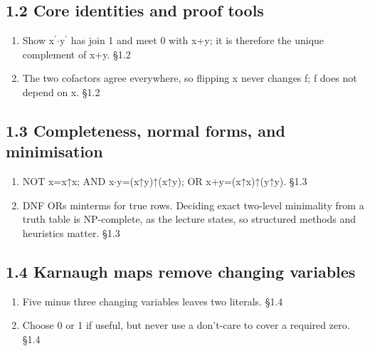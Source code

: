 \documentclass[11pt]{article}
\begin{document}
\begin{keepsection}\subsection{1.2 Core identities and proof tools}

\begin{enumerate}
\item Show x\ensuremath{{}^{\prime}}\ensuremath{\cdot}y\ensuremath{{}^{\prime}} has join 1 and meet 0 with x+y; it is therefore the unique complement of x+y. \hfill{\small\color{FAUblue}§1.2}
\item The two cofactors agree everywhere, so flipping x never changes f; f does not depend on x. \hfill{\small\color{FAUblue}§1.2}
\end{enumerate}

\end{keepsection}
\begin{keepsection}\subsection{1.3 Completeness, normal forms, and minimisation}

\begin{enumerate}
\item NOT x=x↑x; AND x\ensuremath{\cdot}y=(x↑y)↑(x↑y); OR x+y=(x↑x)↑(y↑y). \hfill{\small\color{FAUblue}§1.3}
\item DNF ORs minterms for true rows. Deciding exact two-level minimality from a truth table is NP-complete, as the lecture states, so structured methods and heuristics matter. \hfill{\small\color{FAUblue}§1.3}
\end{enumerate}

\end{keepsection}
\begin{keepsection}\subsection{1.4 Karnaugh maps remove changing variables}

\begin{enumerate}
\item Five minus three changing variables leaves two literals. \hfill{\small\color{FAUblue}§1.4}
\item Choose 0 or 1 if useful, but never use a don’t-care to cover a required zero. \hfill{\small\color{FAUblue}§1.4}
\end{enumerate}

\end{keepsection}
\end{document}
